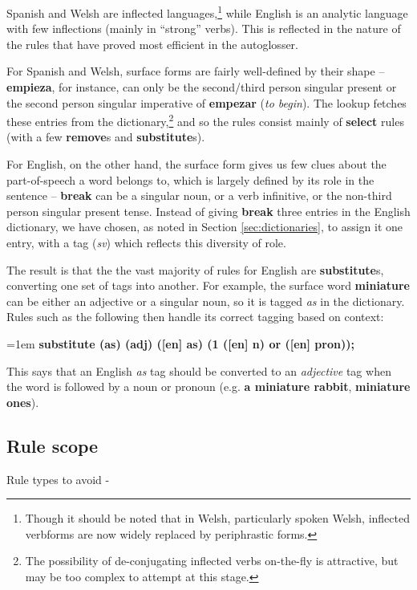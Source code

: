 \documentclass[11pt]{article}
\begin{document}
Spanish and Welsh are inflected languages,\footnote{Though it should be noted that in Welsh, particularly spoken Welsh, inflected verbforms are now widely replaced by periphrastic forms.} while English is an analytic language with few inflections (mainly in ``strong'' verbs).  This is reflected in the nature of the rules that have proved most efficient in the autoglosser.

For Spanish and Welsh, surface forms are fairly well-defined by their shape -- \textbf{empieza}, for instance, can only be the second/third person singular present or the second person singular imperative of \textbf{empezar} (\textit{to begin}).  The lookup fetches these entries from the dictionary,\footnote{The possibility of de-conjugating inflected verbs on-the-fly is attractive, but may be too complex to attempt at this stage.} and so the rules consist mainly of \textbf{select} rules (with a few \textbf{remove}s and \textbf{substitute}s).

For English, on the other hand, the surface form gives us few clues about the part-of-speech a word belongs to, which is largely defined by its role in the sentence -- \textbf{break} can be a singular noun, or a verb infinitive, or the non-third person singular present tense.  Instead of giving \textbf{break} three entries in the English dictionary, we have chosen, as noted in Section  \ref{sec:dictionaries},  to assign it one entry, with a tag (\textit{sv}) which reflects this diversity of role.  

The result is that the the vast majority of rules for English are \textbf{substitute}s, converting one set of tags into another.  For example, the surface word \textbf{miniature} can be either an adjective or a singular noun, so it is tagged \textit{as} in the dictionary.  Rules such as the following then handle its correct tagging based on context:

\noindent
\hangindent=1em
\textbf{substitute (as) (adj) ([en] as) (1 ([en] n) or ([en] pron));}

\noindent This says that an English \textit{as} tag should be converted to an \textit{adjective} tag when the word is followed by a noun or pronoun (e.g. \textbf{a miniature rabbit}, \textbf{miniature ones}).


\subsection{Rule scope}
\label{sec:scope}


Rule types to avoid - 
\end{document}
